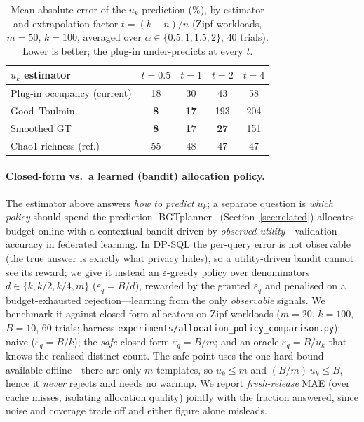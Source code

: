 \documentclass[sigconf,nonacm]{acmart}
\newcommand{\eps}{\varepsilon}
\begin{document}
\begin{table}[h]
\footnotesize
\centering
\caption{Mean absolute error of the $u_k$ prediction (\%), by estimator and extrapolation factor $t=(k-n)/n$ (Zipf workloads, $m=50$, $k=100$, averaged over $\alpha\in\{0.5,1,1.5,2\}$, $40$ trials). Lower is better; the plug-in under-predicts at every $t$.}
\label{tab:predictors}
\begin{tabular}{l|cccc}
\toprule
$u_k$ estimator & $t{=}0.5$ & $t{=}1$ & $t{=}2$ & $t{=}4$ \\
\midrule
Plug-in occupancy (current) & 18 & 30 & 43 & 58 \\
Good--Toulmin~\cite{goodtoulmin1956} & \textbf{8} & \textbf{17} & 193 & 204 \\
Smoothed GT~\cite{orlitsky2016unseen} & \textbf{8} & \textbf{17} & \textbf{27} & 151 \\
Chao1 richness (ref.)~\cite{chao1984} & 55 & 48 & 47 & 47 \\
\bottomrule
\end{tabular}
\end{table}

\paragraph{Closed-form vs.\ a learned (bandit) allocation policy.}
The estimator above answers \emph{how to predict} $u_k$; a separate question is \emph{which policy} should spend the prediction. BGTplanner~\cite{zhang2024bgtplanner} (Section~\ref{sec:related}) allocates budget online with a contextual bandit driven by \emph{observed utility}---validation accuracy in federated learning. In DP-SQL the per-query error is not observable (the true answer is exactly what privacy hides), so a utility-driven bandit cannot see its reward; we give it instead an $\eps$-greedy policy over denominators $d\in\{k,k/2,k/4,m\}$ ($\eps_q=B/d$), rewarded by the granted $\eps_q$ and penalised on a budget-exhausted rejection---learning from the only \emph{observable} signals. We benchmark it against closed-form allocators on Zipf workloads ($m=20$, $k=100$, $B=10$, $60$ trials; harness \texttt{experiments/allocation\_policy\_comparison.py}): naive ($\eps_q=B/k$); the \emph{safe} closed form $\eps_q=B/m$; and an oracle $\eps_q=B/u_k$ that knows the realised distinct count. The safe point uses the one hard bound available offline---there are only $m$ templates, so $u_k\le m$ and $(B/m)\,u_k\le B$, hence it \emph{never} rejects and needs no warmup. We report \emph{fresh-release} MAE (over cache misses, isolating allocation quality) jointly with the fraction answered, since noise and coverage trade off and either figure alone misleads.
\end{document}
